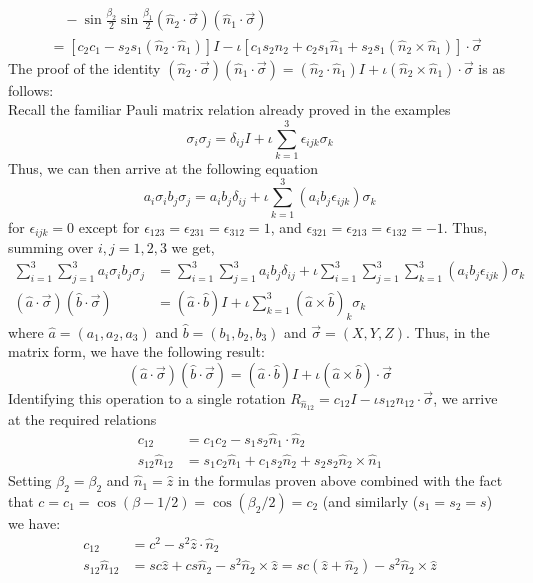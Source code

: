 \begin{example}
\begin{align*}
        &\quad -\sin\frac{\beta_2}{2}\sin\frac{\beta_1}{2} (\hat{n}_2\cdot\vec{\sigma})(\hat{n}_1 \cdot\vec{\sigma})\\
        &=[c_2c_1-s_2s_1(\hat{n}_2\cdot\hat{n}_1)]I-\iota [c_1s_2\hat{n}_2+c_2s_1\hat{n}_1+s_2s_1(\hat{n}_2 \times \hat{n}_1)]\cdot\vec{\sigma}
    \end{align*}
    The proof of the identity $(\hat{n}_2 \cdot\vec{\sigma})(\hat{n}_1 \cdot\vec{\sigma})=(\hat{n}_2 \cdot\hat{n}_1)I+\iota (\hat{n}_2\times \hat{n}_1)\cdot \vec{\sigma}$ is as follows:\\
    Recall the familiar Pauli matrix relation already proved in the examples
    \[
    \sigma_i\sigma_j =\delta_{ij} I +\iota \sum_{k=1}^3\epsilon_{ijk}\sigma_k
    \]
    Thus, we can then arrive at the following equation
    \[
    a_i\sigma_ib_j\sigma_j = a_i b_j\delta_{ij} + \iota \sum_{k=1}^3 (a_ib_j\epsilon_{ijk})\sigma_k
    \]
    for $\epsilon_{ijk}=0$ except for $\epsilon_{123}=\epsilon_{231}=\epsilon_{312}=1$, and $\epsilon_{321}=\epsilon_{213}=\epsilon_{132}=-1$. Thus, summing over $i,j=1,2,3$ we get,
    \begin{align*}
    \sum_{i=1}^3\sum_{j=1}^3 a_i\sigma_ib_j\sigma_j &= \sum_{i=1}^3\sum_{j=1}^3a_ib_j \delta_{ij} +\iota \sum_{i=1}^3\sum_{j=1}^3\sum_{k=1}^3(a_ib_j\epsilon_{ijk})\sigma_k\\
    (\hat{a}\cdot\vec{\sigma})(\hat{b}\cdot\vec{\sigma})&=(\hat{a}\cdot\hat{b})I+\iota \sum_{k=1}^3 (\hat{a}\times \hat{b})_k\sigma_k
    \end{align*}
    where $\hat{a}=(a_1,a_2,a_3)$ and $\hat{b}=(b_1,b_2,b_3)$ and $\vec{\sigma} = (X,Y,Z)$. Thus, in the matrix form, we have the following result:
    \[
    (\hat{a}\cdot\vec{\sigma})(\hat{b}\cdot\vec{\sigma})=(\hat{a}\cdot\hat{b})I+\iota (\hat{a}\times \hat{b})\cdot\vec{\sigma}
    \]
    Identifying this operation to a single rotation $R_{\hat{n}_{12}}=c_{12}I-\iota s_{12}\hat{n}_{12}\cdot\vec{\sigma}$, we arrive at the required relations
    \begin{align*}
        c_{12} &=c_1c_2 - s_1s_2 \hat{n}_1\cdot\hat{n}_2\\
        s_{12}\hat{n}_{12} &=s_1c_2\hat{n}_1 + c_1s_2\hat{n}_2 +s_2s_2 \hat{n}_2 \times \hat{n}_1
    \end{align*}
    Setting $\beta_2=\beta_2$ and $\hat{n}_1 = \hat{z}$ in the formulas proven above combined with the fact that $c=c_1=\cos (\beta-1/2)=\cos (\beta_2/2)=c_2$ (and similarly ($s_1=s_2=s$) we have:
    \begin{align*}
        c_{12}&=c^2-s^2 \hat{z}\cdot\hat{n}_2\\
        s_{12}\hat{n}_{12} &=sc\hat{z} + cs\hat{n}_2 -s^2 \hat{n}_2 \times \hat{z} = sc(\hat{z}+\hat{n}_2)-s^2\hat{n}_2 \times \hat{z}
    \end{align*}
\end{example}
